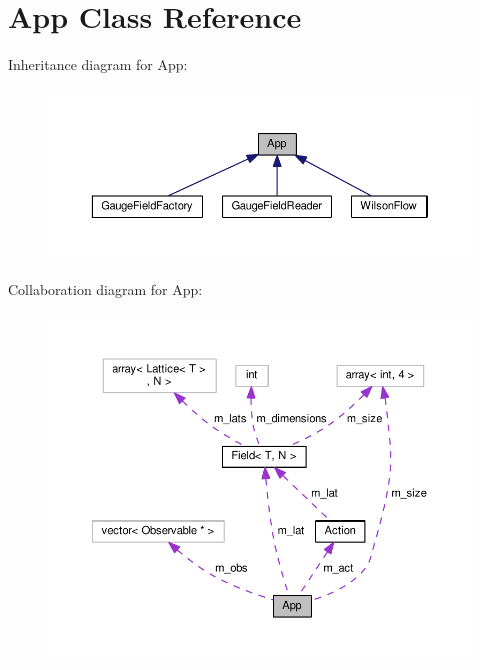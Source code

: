 \hypertarget{classApp}{}\section{App Class Reference}
\label{classApp}


Inheritance diagram for App\+:\nopagebreak
\begin{figure}[H]
\begin{center}
\leavevmode
\includegraphics[width=350pt]{dd/dcc/classApp__inherit__graph}
\end{center}
\end{figure}


Collaboration diagram for App\+:
\nopagebreak
\begin{figure}[H]
\begin{center}
\leavevmode
\includegraphics[width=350pt]{d6/d76/classApp__coll__graph}
\end{center}
\end{figure}
